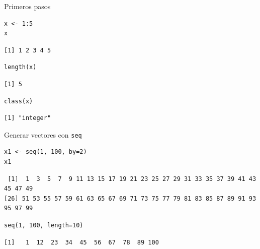 \documentclass[xcolor={usenames,svgnames,dvipsnames}]{beamer}
\begin{document}
\begin{frame}[fragile,label=sec-2-1-1]{Primeros pasos}
 \lstset{language=R,label= ,caption= ,numbers=none}
\begin{lstlisting}
x <- 1:5
x
\end{lstlisting}

\begin{verbatim}
[1] 1 2 3 4 5
\end{verbatim}

\lstset{language=R,label= ,caption= ,numbers=none}
\begin{lstlisting}
length(x)
\end{lstlisting}

\begin{verbatim}
[1] 5
\end{verbatim}

\lstset{language=R,label= ,caption= ,numbers=none}
\begin{lstlisting}
class(x)
\end{lstlisting}

\begin{verbatim}
[1] "integer"
\end{verbatim}
\end{frame}


\begin{frame}[fragile,label=sec-2-1-2]{Generar vectores con \texttt{seq}}
 \lstset{language=R,label= ,caption= ,numbers=none}
\begin{lstlisting}
x1 <- seq(1, 100, by=2)
x1
\end{lstlisting}

\begin{verbatim}
 [1]  1  3  5  7  9 11 13 15 17 19 21 23 25 27 29 31 33 35 37 39 41 43 45 47 49
[26] 51 53 55 57 59 61 63 65 67 69 71 73 75 77 79 81 83 85 87 89 91 93 95 97 99
\end{verbatim}

\lstset{language=R,label= ,caption= ,numbers=none}
\begin{lstlisting}
seq(1, 100, length=10)
\end{lstlisting}

\begin{verbatim}
[1]   1  12  23  34  45  56  67  78  89 100
\end{verbatim}
\end{frame}
\end{document}
